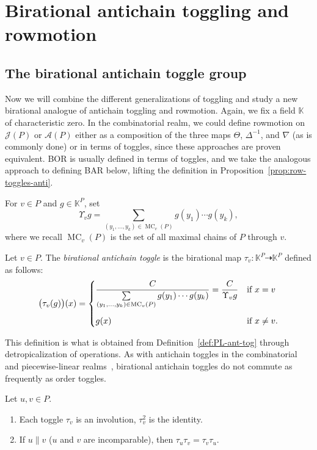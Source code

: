 \documentclass[ALCO,ThmDefs,Unicode,epreuves]{cedram}
\newcommand{\defn}[1]{\emph{#1}}
\newcommand{\kk}{\mathbb{K}}
\newcommand{\dra}{\dashrightarrow}
\newcommand{\down}{\nabla}
\newcommand{\up}{\Delta}
\DeclareMathOperator{\mc}{MC}
\newcommand{\cala}{\mathcal{A}}
\newcommand{\calj}{\mathcal{J}}
\begin{document}
\section{Birational antichain toggling and rowmotion}\label{sec:batar}
\subsection{The birational antichain toggle group}
Now we will combine the different generalizations of toggling and study a new birational analogue of antichain toggling and rowmotion.
Again, we fix a field $\kk$ of characteristic zero.
In the combinatorial realm, we could define rowmotion on $\calj(P)$ or $\cala(P)$ either as
a composition of the three maps 
$\Theta$, $\up^{-1}$, and $\down$ (as is commonly done)
or in terms of toggles, since these approaches are proven equivalent.
BOR is usually defined in terms of toggles, and we take the analogous approach to defining
BAR below, lifting the definition in 
Proposition~\ref{prop:row-toggles-anti}.

\begin{defi}
For $v\in P$ and $g\in \kk^P$, set
\[
\Upsilon_v g=
\sum\limits_{(y_1,\dots,y_k)\in \mc_v(P)} g(y_1) \cdots g(y_k),
\]
where we recall $\mc_v(P)$ is the set of all maximal chains of $P$ through $v$.
\end{defi}

\begin{defi}
Let $v\in P$. The \defn{birational antichain toggle} is the birational map $\tau_v:\kk^P \dra \kk^P$ defined as follows:
\[
\big(\tau_v(g)\big)(x) = \begin{cases}
\dfrac{C}{\sum\limits_{(y_1,\dots,y_k)\in \mc_v(P)} g(y_1) \cdots g(y_k)} = \dfrac{C}{\Upsilon_v g} &\text{if $x=v$}\\\vspace{-7 pt}\\
g(x) &\text{if $x\not=v$}.
\end{cases}
\]
\end{defi}

This definition is what is obtained from Definition~\ref{def:PL-ant-tog}
through detropicalization of operations.
As with antichain toggles in the combinatorial and piecewise-linear 
realms~\cite{strikergentog,antichain-toggling}, birational antichain toggles do not commute
as frequently as order toggles. 

\begin{prop}\label{prop:basic-tau-prop}
Let $u,v\in P$.
\begin{enumerate}[label=(\alph*)]
\item\label{prop3.3_1} Each toggle $\tau_v$ is an involution, \ie $\tau_v^2$ is the identity.
\item\label{prop3.3_2} If $u\parallel v$ (\ie $u$ and $v$ are incomparable), then $\tau_u \tau_v = \tau_v \tau_u$.
\end{enumerate}
\end{prop}
\end{document}
